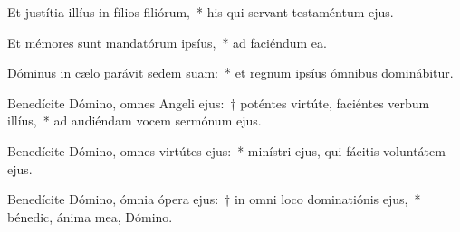 \item Et justítia illíus in fílios filiórum,~* his qui servant testaméntum ejus.

\item Et mémores sunt mandatórum ipsíus,~* ad faciéndum ea.

\item Dóminus in cælo parávit sedem suam:~* et regnum ipsíus ómnibus dominábitur.

\item Benedícite Dómino, omnes Angeli ejus:~† poténtes virtúte, faciéntes verbum illíus,~* ad audiéndam vocem sermónum ejus.

\item Benedícite Dómino, omnes virtútes ejus:~* minístri ejus, qui fácitis voluntátem ejus.

\item Benedícite Dómino, ómnia ópera ejus:~† in omni loco dominatiónis ejus,~* bénedic, ánima mea, Dómino.
